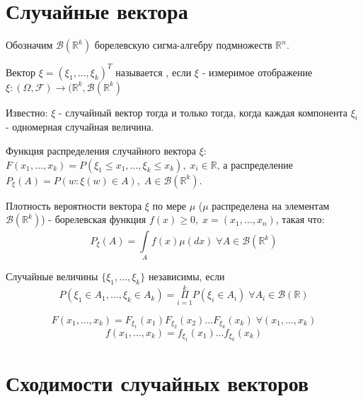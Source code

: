 \section{Случайные вектора}\label{cha:1/sec:2}

Обозначим $\mathcal{B}(\mathbb{R}^k)$ борелевскую сигма-алгебру подмножеств $\mathbb{R}^n$.

\begin{definition}\label{cha:1/def:10}
	Вектор $\xi = (\xi_1, \dots, \xi_k)^T$ называется , если $\xi$ - измеримое отображение $\xi: (\Omega, \mathcal{F}) \to (\mathbb{R}^k, \mathcal{B}(\mathbb{R}^k)$
\end{definition}

Известно: $\xi$ - случайный вектор тогда и только тогда, когда каждая компонента $\xi_i$ - одномерная случайная величина.

\begin{definition}\label{cha:1/def:11}
	Функция распределения случайного вектора $\xi$: $F(x_1, \dots, x_k) = P(\xi_1 \le x_1, \dots, \xi_k \le x_k), \; x_i \in \mathbb{R}$, а распределение $P_{\xi}(A) = P(w: \xi(w) \in A), \; A \in \mathcal{B}(\mathbb{R}^k)$.
\end{definition}

\begin{definition}\label{cha:1/def:12}
	Плотность вероятности вектора $\xi$ по мере $\mu$ ($\mu$ распределена на элементам $\mathcal{B}(\mathbb{R}^k)$) - борелевская функция $f(x) \ge 0, \; x = (x_1, \dots, x_n)$, такая что:
	$$P_{\xi}(A) = \underset{A}{\overset{}{\int}}f(x) \mu (dx) \; \forall A \in \mathcal{B}(\mathbb{R}^k)$$
\end{definition}

\begin{definition}\label{cha:1/def:13}
	Случайные величины $\{\xi_1, \dots, \xi_k\}$ независимы, если
	$$P(\xi_1 \in A_1, \dots, \xi_k \in A_k) = \underset{i=1}{\overset{k}{\Pi}} P(\xi_i \in A_i) \; \forall A_i \in \mathcal{B}(\mathbb{R})$$
\end{definition}

\begin{propose}\label{cha:1/propose:1}
	$$F(x_1, \dots, x_k) = F_{\xi_1} (x_1) F_{\xi_2}(x_2) \dots F_{\xi_k}(x_k) \; \forall (x_1, \dots, x_k)$$
	$$f(x_1, \dots, x_k) = f_{\xi_1}(x_1)\dots f_{\xi_k}(x_k)$$
\end{propose}

\section{Сходимости случайных векторов}\label{cha:1/sec:3}

